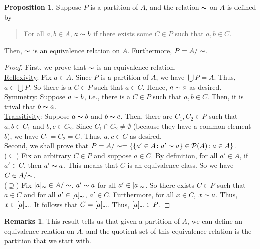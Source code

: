 \documentclass[14pt]{article}
\theoremstyle{definition}
\newtheorem*{remark}{Remarks}
\newtheorem{proposition}[definition]{Proposition}
\newcommand{\eq}{\thicksim}
\newcommand{\quotient}{A/\thicksim}
\begin{document}
\vspace{2mm}

\begin{proposition}
    Suppose $P$ is a partition of $A$, and the relation $\eq$ on $A$ is defined by 
    \begin{quote}
        \centering For all $a,b\in A$,  $a\eq b$ if there exists some $C\in P$ such that $a,b\in C$.
    \end{quote}
    Then, $\eq$ is an equivalence relation on $A$. Furthermore, $P=A/\eq$.
\end{proposition}

\begin{proof}
First, we prove that $\eq$ is an equivalence relation.\\
\underline{Reflexivity}: Fix $a\in A$. Since $P$ is a partition of $A$, 
we have $\bigcup P=A $. Thus, $a\in\bigcup P$. So there is a $C\in P$ such that 
$a\in C$. Hence, $a\eq a$ as desired.\\
\underline{Symmetry}: Suppose $a\eq b$, i.e., there is a $C\in P$ such that $a,b\in C$.
Then, it is trival that $b\eq a$.\\
\underline{Transitivity}: Suppose $a\eq b$ and $b\eq c$. Then, there are $C_1, C_2\in P$
such that $a,b\in C_1$ and $b,c\in C_2$. Since $C_1\cap C_2\not=\emptyset$ (because they have a common element $b$),
we have $C_1=C_2=C$. Thus, $a,c\in C$ as desired.\\
Second, we shall prove that $P=\quotient=\{\{a'\in A\colon a'\thicksim a\}\in \mathcal{P}(A)\colon a\in A\}$.\\  
($\subseteq$) Fix an arbitrary $C\in P$ and suppose $a\in C$. By definition, for all $a'\in A$, if $a'\in C$, then $a'\eq a$. 
This means that $C$ is an equivalence class. So we have $C\in A/{\eq}$. \\
($\supseteq$) Fix $[a]_{\eq}\in A/\eq$. $a'\eq a$ for all $a'\in[a]_{\eq}$.
So there exists  $C\in P$ such that $a\in C$ and for all $a'\in [a]_{\eq} $,  $a'\in C$. Furthermore,
for all $x\in C$, $x\eq a$. Thus, $x\in[a]_{\eq}$. It follows that $C=[a]_{\eq}$. Thus, $[a]_{\eq}\in P$. 
\end{proof}

\begin{remark}
    This result tells us that given a partition of $A$, we can define an equivalence relation
    on $A$, and the quotient set of this equivalence relation is the partition that we start with.

\end{remark}
\end{document}
